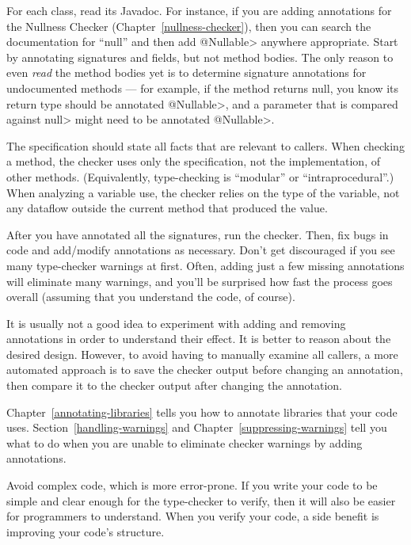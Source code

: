 For each class, read its Javadoc.  For instance, if you are adding
annotations for the Nullness Checker (Chapter~\ref{nullness-checker}), then
you can search the documentation for ``null'' and then add \<@Nullable>
anywhere appropriate.  Start by annotating signatures and fields, but not
method bodies.  The only reason to even
\emph{read} the method bodies yet is to determine signature annotations for
undocumented methods ---
for example, if the method returns null, you know its return type should be
annotated \<@Nullable>, and a parameter that is compared against \<null>
might need to be annotated \<@Nullable>.

The specification should state all facts that are relevant to callers.
When checking a method, the checker uses only the specification, not the
implementation, of other methods.  (Equivalently, type-checking is
``modular'' or ``intraprocedural''.)  When analyzing a variable use, the
checker relies on the type of the variable, not any dataflow outside the
current method that produced the value.

After you have annotated all the signatures, run the checker.
Then, fix bugs in code and add/modify annotations as necessary.
Don't get discouraged if you see many type-checker warnings at first.
Often, adding just a few missing annotations will eliminate many warnings,
and you'll be surprised how fast the process goes overall (assuming that
you understand the code, of course).

It is usually not a good idea to experiment with adding and removing
annotations in order to understand their effect.  It is better to reason
about the desired design.  However, to avoid having to manually examine all
callers, a more automated approach is to save the checker output before
changing an annotation, then compare it to the checker output after
changing the annotation.

Chapter~\ref{annotating-libraries} tells you how to annotate libraries that
your code uses.  Section~\ref{handling-warnings} and
Chapter~\ref{suppressing-warnings} tell you what to do when you are unable
to eliminate checker warnings by adding annotations.



Avoid complex code, which is more error-prone.  If you write your code to
be simple and clear enough for the type-checker to verify, then it will
also be easier for programmers to understand.  When you verify your code, a
side benefit is improving your code's structure.

